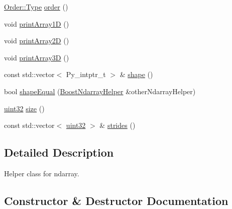 \begin{DoxyCompactItemize}
\item 
\mbox{\hyperlink{struct_num_c_1_1_order_aec83b68303911af9c219019600b56f23}{Order\+::\+Type}} \mbox{\hyperlink{class_num_c_1_1_boost_ndarray_helper_a8995280ded1f4c28ff17f4bcbfe0b84e}{order}} ()
\item 
void \mbox{\hyperlink{class_num_c_1_1_boost_ndarray_helper_ad34f79cce34b53db9a368f74fb8d3147}{print\+Array1D}} ()
\item 
void \mbox{\hyperlink{class_num_c_1_1_boost_ndarray_helper_a190d7e62ef5bd8bcf6212ebda2b22869}{print\+Array2D}} ()
\item 
void \mbox{\hyperlink{class_num_c_1_1_boost_ndarray_helper_aacac04deba2f5405ab9188b2818853f9}{print\+Array3D}} ()
\item 
const std\+::vector$<$ Py\+\_\+intptr\+\_\+t $>$ \& \mbox{\hyperlink{class_num_c_1_1_boost_ndarray_helper_a816ee8ee38680bbeb977725474d58559}{shape}} ()
\item 
bool \mbox{\hyperlink{class_num_c_1_1_boost_ndarray_helper_aa0fd675809776b5a6b582282c7ef40b2}{shape\+Equal}} (\mbox{\hyperlink{class_num_c_1_1_boost_ndarray_helper}{Boost\+Ndarray\+Helper}} \&other\+Ndarray\+Helper)
\item 
\mbox{\hyperlink{namespace_num_c_ae685802ca6d3035f2b400b081e3953fa}{uint32}} \mbox{\hyperlink{class_num_c_1_1_boost_ndarray_helper_afaa5bd97ec3de6c055069dc54c12a02a}{size}} ()
\item 
const std\+::vector$<$ \mbox{\hyperlink{namespace_num_c_ae685802ca6d3035f2b400b081e3953fa}{uint32}} $>$ \& \mbox{\hyperlink{class_num_c_1_1_boost_ndarray_helper_a760449f72af3dd8eadd67663feba6712}{strides}} ()
\end{DoxyCompactItemize}


\subsection{Detailed Description}
Helper class for ndarray. 

\subsection{Constructor \& Destructor Documentation}
\mbox{\label{class_num_c_1_1_boost_ndarray_helper_a48328556cee91ae3f673f3b68548d21a}} 
